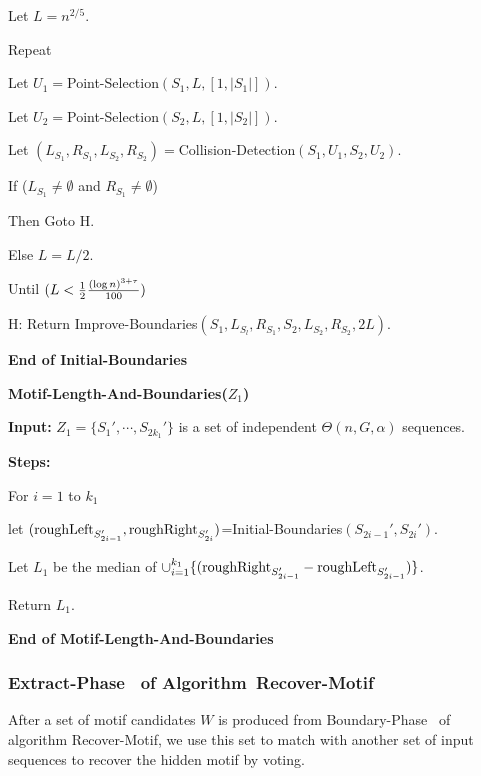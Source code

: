 \documentclass[11pt]{article}
\newcommand{\algmnam}{Recover-Motif}
\newcommand{\algmname}{Algorithm~\algmnam}
\newcommand{\algma}{\algmname~}
\newcommand{\roughright}{{\rm roughRight}}
\newcommand{\phaseone}{Boundary-Phase}
\newcommand{\phasetwo}{Extract-Phase}
\newcommand{\thresholdL}{{(\log n)^{3+\tau}\over 100}}
\begin{document}
\qquad Let $L=n^{2/5}$.

\qquad Repeat


\qquad\qquad Let $U_1=$Point-Selection$(S_1,L, [1,|S_1|])$.

\qquad\qquad Let $U_2=$Point-Selection$(S_2,L, [1,|S_2|])$.

\qquad\qquad Let
$(L_{S_1},R_{S_1},L_{S_2},R_{S_2})=$Collision-Detection$(S_1, U_1,
S_2, U_2)$.

\qquad\qquad If ($L_{S_1}\not=\emptyset$ and
$R_{S_1}\not=\emptyset$)


\qquad\qquad Then Goto H.

\qquad\qquad Else $L=L/2$.

\qquad Until $(L< {1\over 2}\thresholdL)$

\qquad H: Return Improve-Boundaries$(S_1,L_{S_l}, R_{S_1}, S_2,
L_{S_2}, R_{S_2}, 2L)$.



{\bf End of Initial-Boundaries}


\vskip 10pt

{\bf Motif-Length-And-Boundaries($Z_1$)}

{\bf Input:} $Z_1=\{S_{1}',\cdots,S_{2k_1}'\}$ is a set of
independent $\Theta(n,G,\alpha)$ sequences.

{\bf Steps:}

For $i=1$ to $k_1$

\qquad let
$(\roughleft_{S_{2i-1}'},\roughright_{S_{2i}'})$=Initial-Boundaries$(S_{2i-1}',S_{2i}')$.


Let $L_1$ be the median of
$\cup_{i=1}^{k_1}\{(\roughright_{S_{2i-1}'}-\roughleft_{S_{2i-1}'})\}$.


Return $L_1$.

 {\bf End of Motif-Length-And-Boundaries}







\subsubsection{\phasetwo~ of \algma}




After a set of motif candidates $W$ is produced from \phaseone~ of
algorithm \algmnam, we use this set to match with another set of
input sequences to recover the hidden motif by voting.

\vskip 10pt
\end{document}
